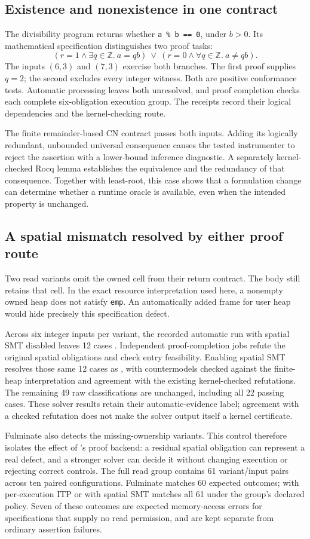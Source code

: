\subsection{Existence and nonexistence in one contract}
The divisibility program returns whether \texttt{a \% b == 0}, under $b>0$.
Its mathematical specification distinguishes two proof tasks:
\[
(r=1\land\exists q\in\mathbb Z.\ a=qb)
\ \lor\ (r=0\land\forall q\in\mathbb Z.\ a\ne qb).
\]
The inputs $(6,3)$ and $(7,3)$ exercise both branches. The first proof supplies
$q=2$; the second excludes every integer witness. Both are positive
conformance tests. Automatic processing leaves both unresolved, and proof
completion checks each complete six-obligation execution group. The receipts
record their logical dependencies and the kernel-checking route.

The finite remainder-based CN contract passes both inputs. Adding its
logically redundant, unbounded universal consequence causes the tested
instrumenter to reject the assertion with a lower-bound inference diagnostic.
A separately kernel-checked Rocq lemma establishes the equivalence and the
redundancy of that consequence. Together with least-root, this case shows
that a formulation change can determine whether a runtime oracle is available,
even when the intended property is unchanged.

\subsection{A spatial mismatch resolved by either proof route}
Two read variants omit the owned cell from their return contract. The body
still retains that cell. In the exact resource interpretation used here,
a nonempty owned heap does not satisfy \texttt{emp}. An automatically added
frame for user heap would hide precisely this specification defect.

Across six integer inputs per variant, the recorded automatic run with
spatial SMT disabled leaves 12 cases \unknown{}. Independent proof-completion
jobs refute the original spatial obligations and check entry feasibility.
Enabling spatial SMT resolves those same 12 cases as \fail{}, with
countermodels checked against the finite-heap interpretation and agreement
with the existing kernel-checked refutations. The remaining 49 raw
classifications are unchanged, including all 22 passing cases. These solver
results retain their automatic-evidence label; agreement with a checked
refutation does not make the solver output itself a kernel certificate.

Fulminate also detects the missing-ownership variants. This control therefore
isolates the effect of \tespec{}'s proof backend: a residual spatial obligation
can represent a real defect, and a stronger solver can decide it without
changing execution or rejecting correct controls. The full read group contains
61 variant/input pairs across ten paired configurations. Fulminate matches
60 expected outcomes; \tespec{} with per-execution ITP or with spatial SMT
matches all 61 under the group's declared policy. Seven of these outcomes
are expected memory-access errors for specifications that supply no read
permission, and are kept separate from ordinary assertion failures.
